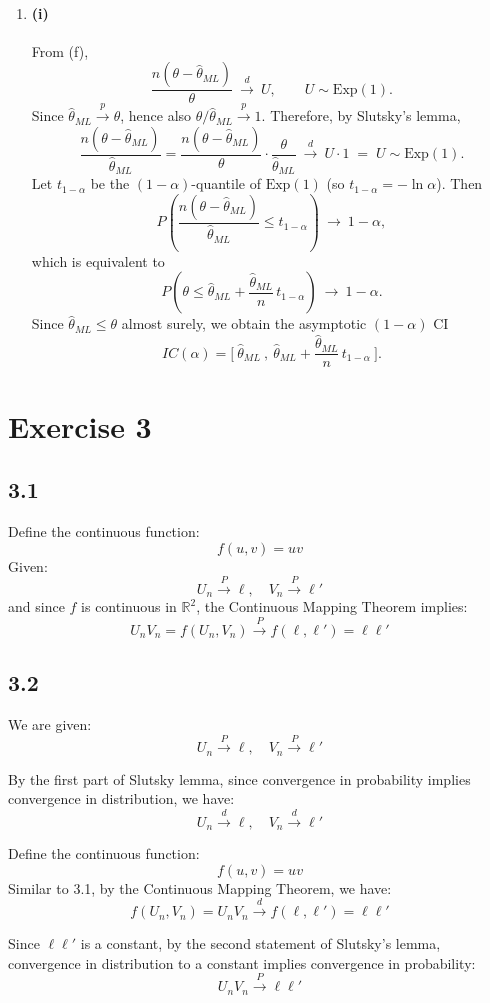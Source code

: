 \documentclass[12pt]{article}
\begin{document}
\begin{flushleft}
\begin{enumerate}[label=(\alph*)]
\item
\paragraph{(i)}
From (f),
\[
\frac{n(\theta-\hat\theta_{ML})}{\theta}\ \xrightarrow{d}\ U,\qquad U\sim\mathrm{Exp}(1).
\]
Since $\hat\theta_{ML} \xrightarrow{p} \theta$, hence also $\theta/\hat\theta_{ML}\xrightarrow{p}1$.
Therefore, by Slutsky’s lemma,
\[
\frac{n(\theta-\hat\theta_{ML})}{\hat\theta_{ML}}
=\frac{n(\theta-\hat\theta_{ML})}{\theta}\cdot\frac{\theta}{\hat\theta_{ML}}
\ \xrightarrow{d}\ U\cdot 1 \;=\; U\sim\mathrm{Exp}(1).
\]
Let $t_{1-\alpha}$ be the $(1-\alpha)$-quantile of $\mathrm{Exp}(1)$ (so $t_{1-\alpha}=-\ln\alpha$). Then
\[
P\!\left(\frac{n(\theta-\hat\theta_{ML})}{\hat\theta_{ML}}\le t_{1-\alpha}\right)\ \to\ 1-\alpha,
\]
which is equivalent to
\[
P\!\left(\theta \le \hat\theta_{ML}+\frac{\hat\theta_{ML}}{n}\,t_{1-\alpha}\right)\ \to\ 1-\alpha.
\]
Since $\hat\theta_{ML}\le \theta$ almost surely, we obtain the asymptotic $(1-\alpha)$ CI
\[
IC(\alpha)=\bigg[\ \hat\theta_{ML}\ ,\ \hat\theta_{ML}+\frac{\hat\theta_{ML}}{n}\,t_{1-\alpha}\ \bigg].
\]

\end{enumerate}

\section*{Exercise 3}

\subsection*{3.1}
Define the continuous function:
\[
f(u,v) = uv
\]
Given:
\[
U_n \xrightarrow{P} \ell, \quad V_n \xrightarrow{P} \ell'
\]
and since \(f\) is continuous in \(\mathbb{R}^2\), the Continuous Mapping Theorem implies:
\[
U_n V_n = f(U_n, V_n) \xrightarrow{P} f(\ell, \ell') = \ell \ell'
\]

\subsection*{3.2}
We are given:
\[
U_n \xrightarrow{P} \ell, \quad V_n \xrightarrow{P} \ell'
\]

By the first part of Slutsky lemma, since convergence in probability implies convergence in distribution, we have:
\[
U_n \xrightarrow{d} \ell, \quad V_n \xrightarrow{d} \ell'
\]



Define the continuous function:
\[
f(u, v) = uv
\]
Similar to 3.1, by the Continuous Mapping Theorem, we have:
\[
f(U_n, V_n) = U_n V_n \xrightarrow{d} f(\ell, \ell') = \ell \ell'
\]


Since \(\ell \ell'\) is a constant, by the second statement of Slutsky's lemma, convergence in distribution to a constant implies convergence in probability:
\[
U_n V_n \xrightarrow{P} \ell \ell'
\]




\end{flushleft}
\end{document}

